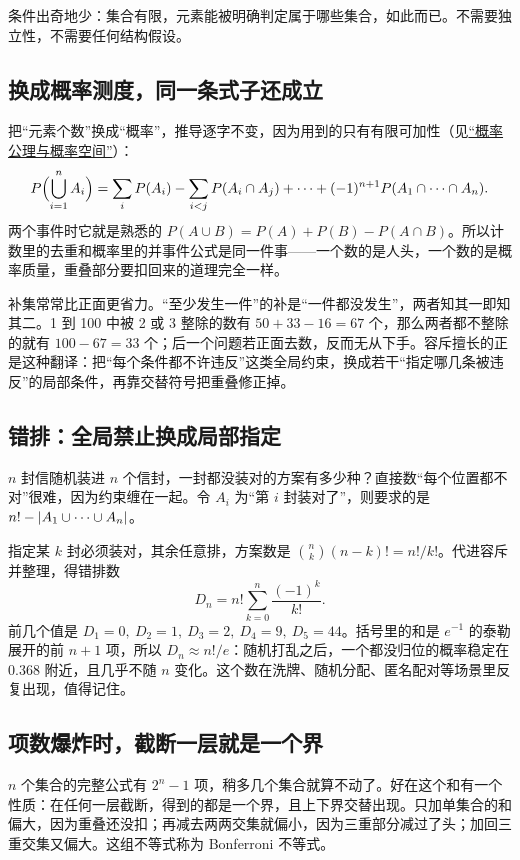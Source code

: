 条件出奇地少：集合有限，元素能被明确判定属于哪些集合，如此而已。不需要独立性，不需要任何结构假设。

\subsection{换成概率测度，同一条式子还成立}

把``元素个数''换成``概率''，推导逐字不变，因为用到的只有有限可加性（见\hyperref[sec:05-Probability/01-Probability-Spaces/02]{``概率公理与概率空间''}）：
\[
P\Bigl(\bigcup_{i=1}^n A_i\Bigr)
=\sum_i P(A_i)-\sum_{i<j}P(A_i\cap A_j)+\cdots+(-1)^{n+1}P(A_1\cap\cdots\cap A_n).
\]
两个事件时它就是熟悉的 \(P(A\cup B)=P(A)+P(B)-P(A\cap B)\)。所以计数里的去重和概率里的并事件公式是同一件事——一个数的是人头，一个数的是概率质量，重叠部分要扣回来的道理完全一样。

补集常常比正面更省力。``至少发生一件''的补是``一件都没发生''，两者知其一即知其二。1 到 100 中被 2 或 3 整除的数有 \(50+33-16=67\) 个，那么两者都不整除的就有 \(100-67=33\) 个；后一个问题若正面去数，反而无从下手。容斥擅长的正是这种翻译：把``每个条件都不许违反''这类全局约束，换成若干``指定哪几条被违反''的局部条件，再靠交替符号把重叠修正掉。

\subsection{错排：全局禁止换成局部指定}

\(n\) 封信随机装进 \(n\) 个信封，一封都没装对的方案有多少种？直接数``每个位置都不对''很难，因为约束缠在一起。令 \(A_i\) 为``第 \(i\) 封装对了''，则要求的是 \(n!-\left|A_1\cup\cdots\cup A_n\right|\)。

指定某 \(k\) 封必须装对，其余任意排，方案数是 \(\binom nk(n-k)!=n!/k!\)。代进容斥并整理，得错排数
\[
D_n=n!\sum_{k=0}^n\frac{(-1)^k}{k!}.
\]
前几个值是 \(D_1=0,\ D_2=1,\ D_3=2,\ D_4=9,\ D_5=44\)。括号里的和是 \(e^{-1}\) 的泰勒展开的前 \(n+1\) 项，所以 \(D_n\approx n!/e\)：随机打乱之后，一个都没归位的概率稳定在 \(0.368\) 附近，且几乎不随 \(n\) 变化。这个数在洗牌、随机分配、匿名配对等场景里反复出现，值得记住。

\subsection{项数爆炸时，截断一层就是一个界}

\(n\) 个集合的完整公式有 \(2^n-1\) 项，稍多几个集合就算不动了。好在这个和有一个性质：在任何一层截断，得到的都是一个界，且上下界交替出现。只加单集合的和偏大，因为重叠还没扣；再减去两两交集就偏小，因为三重部分减过了头；加回三重交集又偏大。这组不等式称为 Bonferroni 不等式。

